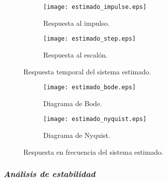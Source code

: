\begin{figure}[H]
    \centering

    \begin{subfigure}[b]{0.49\textwidth}
        \centering
        \texttt{[image: estimado\_impulse.eps]}
        \caption{Respuesta al impulso.}
        \label{fig:estimado_impulse}
    \end{subfigure}
    \begin{subfigure}[b]{0.49\textwidth}
        \centering
        \texttt{[image: estimado\_step.eps]}
        \caption{Respuesta al escalón.}
        \label{fig:estimado_step}
    \end{subfigure}

    \vspace{-0.25cm}
    \caption{Respuesta temporal del sistema estimado.}
    \label{fig:estimado_temporal}
\end{figure}
\vspace{-0.5cm}

\begin{figure}[H]
    \centering

    \begin{subfigure}[b]{0.49\textwidth}
        \centering
        \texttt{[image: estimado\_bode.eps]}
        \caption{Diagrama de Bode.}
        \label{fig:estimado_bode}
    \end{subfigure}
    \begin{subfigure}[b]{0.49\textwidth}
        \centering
        \texttt{[image: estimado\_nyquist.eps]}
        \caption{Diagrama de Nyquist.}
        \label{fig:estimado_nyquist}
    \end{subfigure}

    \vspace{-0.25cm}
    \caption{Respuesta en frecuencia del sistema estimado.}
    \label{fig:estimado_frecuencia}
\end{figure}
\vspace{-0.5cm}

\subsubsection*{\it{Análisis de estabilidad}}
\vspace{-0.5cm}

